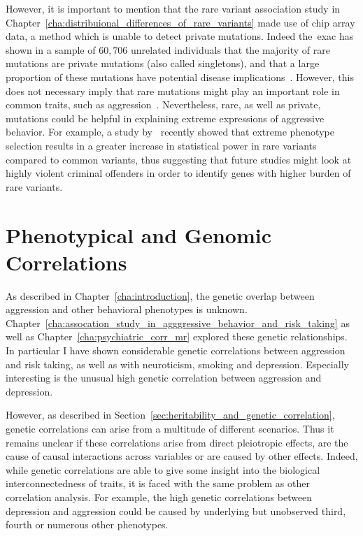 However, it is important to mention that the rare variant association study in Chapter~\ref{cha:distribuional_differences_of_rare_variants} made use of chip array data, a method which is unable to detect private mutations.
Indeed the~\acrfull{exac} has shown in a sample of $60,706$ unrelated individuals that the majority of rare mutations are private mutations (also called singletons), and that a large proportion of these mutations have potential disease implications~\cite{Lek2016,Kobayashi2017}.
However, this does not necessary imply that rare mutations might play an important role in common traits, such as aggression~\cite{Chabris2015}.
Nevertheless, rare, as well as private, mutations could be helpful in explaining extreme expressions of aggressive behavior.
For example, a study by~\cite{Peloso2016} recently showed that extreme phenotype selection results in a greater increase in statistical power in rare variants compared to common variants,
thus suggesting that future studies might look at highly violent criminal offenders in order to identify genes with higher burden of rare variants.

\section{Phenotypical and Genomic Correlations}
\label{sec:phenotypical_and_genomic_correlations}

As described in Chapter~\ref{cha:introduction}, the genetic overlap between aggression and other behavioral phenotypes is unknown.
Chapter~\ref{cha:assocation_study_in_agggressive_behavior_and_risk_taking} as well as Chapter~\ref{cha:psychiatric_corr_mr} explored these genetic relationships.
In particular I have shown considerable genetic correlations between aggression and risk taking, as well as with neuroticism, smoking and depression. 
Especially interesting is the unusual high genetic correlation between aggression and depression.

However, as described in Section~\ref{sec:heritability_and_genetic_correlation}, genetic correlations can arise from a multitude of different scenarios.
Thus it remains unclear if these correlations arise from direct pleiotropic effects, are the cause of causal interactions across variables or are caused by other effects. 
Indeed, while genetic correlations are able to give some insight into the biological interconnectedness of traits, it is faced with the same problem as other correlation analysis. 
For example, the high genetic correlations between depression and aggression could be caused by underlying but unobserved third, fourth or numerous other phenotypes.

